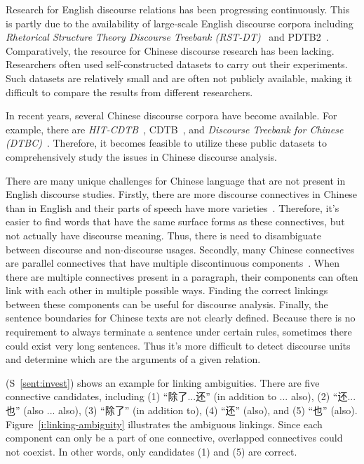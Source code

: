 Research for English discourse relations has been progressing continuously. This is
partly due to the availability of large-scale English discourse corpora including
\textit{Rhetorical Structure Theory Discourse Treebank (RST-DT)}~\citep{Carlson01building}
and PDTB2~\citep{Prasad08thepenn}. Comparatively, the resource for Chinese discourse
research has been lacking. Researchers often used self-constructed datasets to carry
out their experiments. Such datasets are relatively small and are often not publicly
available, making it difficult to compare the results from different researchers.

In recent years, several Chinese discourse corpora have become available. For example,
there are \textit{HIT-CDTB}~\citep{zhang2014chinese}, CDTB~\citep{li2014building}, and
\textit{Discourse Treebank for Chinese (DTBC)}~\citep{zhou2014the}. Therefore, it
becomes feasible to utilize these public datasets to comprehensively study
the issues in Chinese discourse analysis.

There are many unique challenges for Chinese language that are not present in
English discourse studies. Firstly, there are more discourse connectives
in Chinese than in English and their parts of speech have more
varieties~\citep{huang2014interpretation}. Therefore, it's easier to find words
that have the same surface forms as these connectives, but not actually have
discourse meaning. Thus, there is need to disambiguate between
discourse and non-discourse usages.
Secondly, many Chinese connectives are parallel connectives that
have multiple discontinuous components~\citep{zhou2012pdtb}.
When there are multiple connectives present in a paragraph, their components
can often link with each other in multiple possible ways.
Finding the correct linkings between these components
can be useful for discourse analysis. Finally, the sentence boundaries for
Chinese texts are not clearly defined. Because there is no
requirement to always terminate a sentence under certain rules,
sometimes there could exist very long sentences. Thus it's more difficult
to detect discourse units and determine which are the arguments of a given relation.

(S~\ref{sent:invest}) shows an example for linking ambiguities.
There are five connective candidates, including (1) ``除了...还''
(in addition to ... also), (2) ``还...也'' (also ... also),
(3) ``除了'' (in addition to), (4) ``还'' (also), and (5) ``也'' (also).
Figure~\ref{i:linking-ambiguity} illustrates the ambiguous linkings. Since each
component can only be a part of one connective, overlapped connectives could
not coexist.  In other words, only candidates (1) and (5) are correct.

